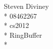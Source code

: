 \documentclass[a4paper,12pt]{article}
\begin{document}
\begin{center}
{\large Steven Diviney} \\*
08462267 \\*
cs2012 \\*
RingBuffer \\*

\end{center}
\end{document}
